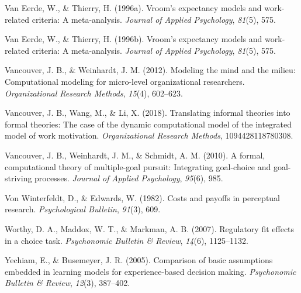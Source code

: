 \documentclass[english,man]{apa6}
\theoremstyle{definition}
\theoremstyle{definition}
\theoremstyle{definition}
\theoremstyle{remark}
\begin{document}
\hypertarget{ref-van1996}{}
Van Eerde, W., \& Thierry, H. (1996a). Vroom's expectancy models and
work-related criteria: A meta-analysis. \emph{Journal of Applied
Psychology}, \emph{81}(5), 575.

\hypertarget{ref-vaneerde1996}{}
Van Eerde, W., \& Thierry, H. (1996b). Vroom's expectancy models and
work-related criteria: A meta-analysis. \emph{Journal of Applied
Psychology}, \emph{81}(5), 575.

\hypertarget{ref-vancouver2012}{}
Vancouver, J. B., \& Weinhardt, J. M. (2012). Modeling the mind and the
milieu: Computational modeling for micro-level organizational
researchers. \emph{Organizational Research Methods}, \emph{15}(4),
602--623.

\hypertarget{ref-vancouver2018}{}
Vancouver, J. B., Wang, M., \& Li, X. (2018). Translating informal
theories into formal theories: The case of the dynamic computational
model of the integrated model of work motivation. \emph{Organizational
Research Methods}, 1094428118780308.

\hypertarget{ref-vancouver2010}{}
Vancouver, J. B., Weinhardt, J. M., \& Schmidt, A. M. (2010). A formal,
computational theory of multiple-goal pursuit: Integrating goal-choice
and goal-striving processes. \emph{Journal of Applied Psychology},
\emph{95}(6), 985.

\hypertarget{ref-von1982}{}
Von Winterfeldt, D., \& Edwards, W. (1982). Costs and payoffs in
perceptual research. \emph{Psychological Bulletin}, \emph{91}(3), 609.

\hypertarget{ref-worthy2007}{}
Worthy, D. A., Maddox, W. T., \& Markman, A. B. (2007). Regulatory fit
effects in a choice task. \emph{Psychonomic Bulletin \& Review},
\emph{14}(6), 1125--1132.

\hypertarget{ref-yechiam2005}{}
Yechiam, E., \& Busemeyer, J. R. (2005). Comparison of basic assumptions
embedded in learning models for experience-based decision making.
\emph{Psychonomic Bulletin \& Review}, \emph{12}(3), 387--402.
\end{document}
